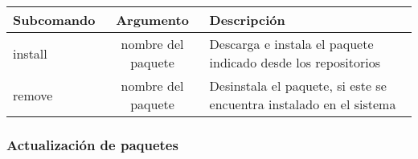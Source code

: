 \begin{longtable}[c]{@{}lcl@{}}
\toprule
\begin{minipage}[b]{0.16\columnwidth}\raggedright\strut
Subcomando
\strut\end{minipage} &
\begin{minipage}[b]{0.16\columnwidth}\centering\strut
Argumento
\strut\end{minipage} &
\begin{minipage}[b]{0.49\columnwidth}\raggedright\strut
Descripción
\strut\end{minipage}\tabularnewline
\midrule
\endhead
\begin{minipage}[t]{0.16\columnwidth}\raggedright\strut
install
\strut\end{minipage} &
\begin{minipage}[t]{0.16\columnwidth}\centering\strut
nombre del paquete
\strut\end{minipage} &
\begin{minipage}[t]{0.49\columnwidth}\raggedright\strut
Descarga e instala el paquete indicado desde los repositorios
\strut\end{minipage}\tabularnewline
\begin{minipage}[t]{0.16\columnwidth}\raggedright\strut
remove
\strut\end{minipage} &
\begin{minipage}[t]{0.16\columnwidth}\centering\strut
nombre del paquete
\strut\end{minipage} &
\begin{minipage}[t]{0.49\columnwidth}\raggedright\strut
Desinstala el paquete, si este se encuentra instalado en el sistema
\strut\end{minipage}\tabularnewline
\bottomrule
\end{longtable}

\hypertarget{actualizaciuxf3n-de-paquetes}{\subsubsection{Actualización
de paquetes}\label{actualizaciuxf3n-de-paquetes}}

